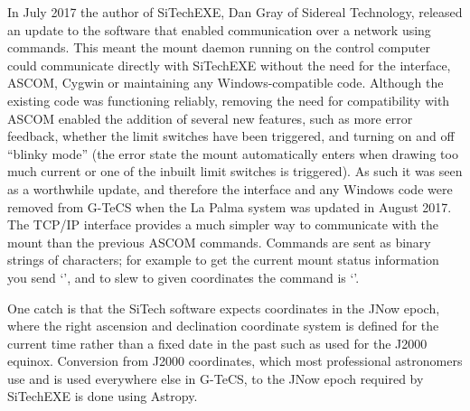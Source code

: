 \begin{colsection}
In July 2017 the author of SiTechEXE, Dan Gray of Sidereal Technology, released an update to the software that enabled communication over a network using  commands. This meant the mount daemon running on the control computer could communicate directly with SiTechEXE without the need for the  interface, ASCOM, Cygwin or maintaining any Windows-compatible code. Although the existing code was functioning reliably, removing the need for compatibility with ASCOM enabled the addition of several new features, such as more error feedback, whether the limit switches have been triggered, and turning on and off ``blinky mode'' (the error state the mount automatically enters when drawing too much current or one of the inbuilt limit switches is triggered). As such it was seen as a worthwhile update, and therefore the  interface and any Windows code were removed from G-TeCS when the La Palma system was updated in August 2017. The TCP/IP interface provides a much simpler way to communicate with the mount than the previous ASCOM commands. Commands are sent as binary strings of characters; for example to get the current mount status information you send `', and to slew to given coordinates the command is `'.

One catch is that the SiTech software expects coordinates in the JNow epoch, where the right ascension and declination coordinate system is defined for the current time rather than a fixed date in the past such as used for the J2000 equinox. Conversion from J2000 coordinates, which most professional astronomers use and is used everywhere else in G-TeCS, to the JNow epoch required by SiTechEXE is done using Astropy.

\end{colsection}


